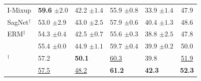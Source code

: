 \begin{table}[htbp]
\begin{tabular}{lllll|c}
I-Mixup & \textbf{59.6} \scriptsize$\pm2.0$ & 42.2 \scriptsize$\pm1.4$ & 55.9 \scriptsize$\pm0.8$ & 33.9 \scriptsize$\pm1.4$ & 47.9 \\
SagNet$^\dagger$ & 53.0 \scriptsize$\pm2.9$ & 43.0 \scriptsize$\pm2.5$ & 57.9 \scriptsize$\pm0.6$ & 40.4 \scriptsize$\pm1.3$ & 48.6 \\
ERM$^\ddagger$ & 54.3 \scriptsize$\pm0.4$ & 42.5 \scriptsize$\pm0.7$ & 55.6 \scriptsize$\pm0.3$ & 38.8 \scriptsize$\pm2.5$ & 47.8 \\
\swad{} & 55.4 \scriptsize$\pm0.0$ & 44.9 \scriptsize$\pm1.1$ & 59.7 \scriptsize$\pm0.4$ & 39.9 \scriptsize$\pm0.2$ & 50.0 \\
\diwa{}$^\dagger$ & 57.2 & \textbf{50.1} & \underline{60.3} & 39.8 & \underline{51.9} \\
\midrule
\cda{} & \underline{57.5} & \underline{48.2} & \textbf{61.2} & \textbf{42.3} & \textbf{52.3} \\
\bottomrule
\end{tabular}
\end{table}

